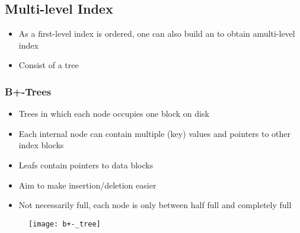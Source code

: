 \subsection{Multi-level Index}

\begin{itemize}
    \item As a first-level index is ordered, one can also build an  to obtain  amulti-level index
    \item Consist of a tree
\end{itemize}

\subsubsection{B+-Trees}

\begin{itemize}
    \item Trees in which each node occupies one block on disk
    \item Each internal node can contain multiple (key) values and pointers to other index blocks
    \item Leafs contain pointers to data blocks
    \item Aim to make insertion/deletion easier
    \item Not necessarily full, each node is only between half full and completely full
\end{itemize}

\begin{figure}[H]
    \centering
    \texttt{[image: b+-\_tree]}
\end{figure}

